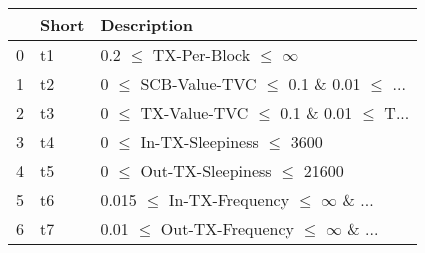 \begin{tabular}{lll}
\toprule
{} & Short &                                        Description \\
\midrule
0 &    t1 &              0.2 $\le$ TX-Per-Block $\le$ $\infty$ \\
1 &    t2 &  0 $\le$ SCB-Value-TVC $\le$ 0.1 \& 0.01 $\le$ ... \\
2 &    t3 &  0 $\le$ TX-Value-TVC $\le$ 0.1 \& 0.01 $\le$ T... \\
3 &    t4 &                0 $\le$ In-TX-Sleepiness $\le$ 3600 \\
4 &    t5 &              0 $\le$ Out-TX-Sleepiness $\le$ 21600 \\
5 &    t6 &  0.015 $\le$ In-TX-Frequency $\le$ $\infty$ \& ... \\
6 &    t7 &  0.01 $\le$ Out-TX-Frequency $\le$ $\infty$ \& ... \\
\bottomrule
\end{tabular}

